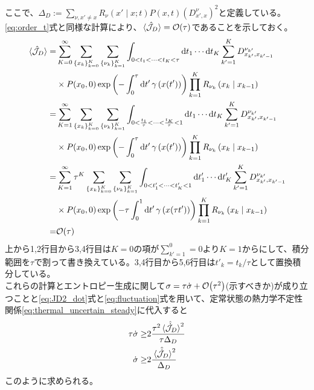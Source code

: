 \documentclass{ltjsarticle}
\begin{document}
ここで、$\Delta_D:=\sum_{\nu,x'\neq x}R_{\nu}\left(x'\mid x;t\right)P(x,t)(D^{\nu}_{x',x})^2$と定義している。\\
\eqref{eq:order_t}式と同様な計算により、$\ev*{\hat{\mathcal{J}}_D}=\order{\tau}$であることを示しておく。\\
\begin{align}
  \ev*{\hat{\mathcal{J}}_D}
  =&\sum_{K=0}^{\infty}\sum_{\lbrace x_k\rbrace_{k=0}^K}\sum_{\lbrace\nu_k\rbrace_{k=1}^K}\int_{0<t_1<\cdots<t_K<\tau}\dd{t_1}\cdots \dd{t_K}\sum_{k'=1}^{K}D^{\nu_{k'}}_{x_{k'},x_{k'-1}}\\
  &\times P(x_0,0)\exp\left(-\int_0^\tau \dd{t'}\gamma\left(x(t')\right)\right)\prod_{k=1}^K R_{\nu_k}\left(x_k\mid x_{k-1}\right)\\
  =&\sum_{K=1}^{\infty}\sum_{\lbrace x_k\rbrace_{k=0}^K}\sum_{\lbrace\nu_k\rbrace_{k=1}^K}\int_{0<\frac{t_1}{\tau}<\cdots<\frac{t_K}{\tau}<1}\dd{t_1}\cdots \dd{t_K}\sum_{k'=1}^{K}D^{\nu_{k'}}_{x_{k'},x_{k'-1}}\\
  &\times P(x_0,0)\exp\left(-\int_0^\tau \dd{t'}\gamma\left(x(t')\right)\right)\prod_{k=1}^K R_{\nu_k}\left(x_k\mid x_{k-1}\right)\\
  =&\sum_{K=1}^{\infty}\tau^K\sum_{\lbrace x_k\rbrace_{k=0}^K}\sum_{\lbrace\nu_k\rbrace_{k=1}^K}\int_{0<t'_1<\cdots<t'_K<1}\dd{t'_1}\cdots \dd{t'_K}\sum_{k'=1}^{K}D^{\nu_{k'}}_{x_{k'},x_{k'-1}}\\
  &\times P(x_0,0)\exp\left(-\tau\int_0^1 \dd{t'}\gamma\left(x(\tau t')\right)\right)\prod_{k=1}^K R_{\nu_k}\left(x_k\mid x_{k-1}\right)\\
  =&\order{\tau}
\end{align}
上から1,2行目から3,4行目は$K=0$の項が$\sum_{k'=1}^0=0$より$K=1$からにして、積分範囲を$\tau$で割って書き換えている。3,4行目から5,6行目は$t'_k=t_k/\tau$として置換積分している。\\
これらの計算とエントロピー生成に関して$\sigma=\tau\dot{\sigma}+\order{\tau^2}$(示すべきか)が成り立つことと\eqref{eq:JD2_dot}式と\eqref{eq:fluctuation}式を用いて、定常状態の熱力学不定性関係\eqref{eq:thermal_uncertain_steady}に代入すると
\begin{align}
  \tau \dot{\sigma}\ge&2\frac{\tau^2\ev*{\hat{\dot{\mathcal{J}}}_D}^2}{\tau \Delta_D}\\
  \dot{\sigma}\ge&2\frac{\ev*{\hat{\dot{\mathcal{J}}}_D}^2}{\Delta_D}\\
\end{align}
このように求められる。
\end{document}
